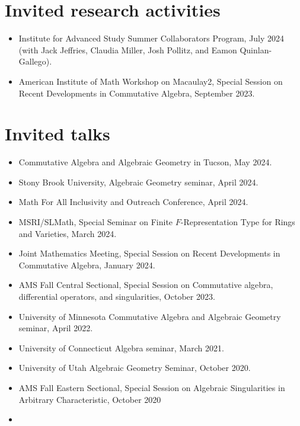 \documentclass{res}
\begin{document}
\begin{resume}
\section{Invited research activities}
\begin{itemize}
\item Institute for Advanced Study Summer Collaborators Program, July 2024 (with Jack Jeffries, Claudia Miller, Josh Pollitz, and Eamon Quinlan-Gallego).
\item American Institute of Math Workshop on Macaulay2, Special Session on Recent Developments in Commutative Algebra, September 2023.
\end{itemize}
\section{Invited talks}
\begin{itemize}
\item Commutative Algebra and Algebraic Geometry in Tucson, May 2024.
\item Stony Brook University, Algebraic Geometry seminar, April 2024.
\item Math For All Inclusivity and Outreach Conference, April 2024.
\item MSRI/SLMath, Special Seminar on Finite $F$-Representation Type for Rings and Varieties, March 2024.
\item Joint Mathematics Meeting, Special Session on Recent Developments in Commutative Algebra, January 2024.
\item 
AMS Fall Central Sectional, Special Session on Commutative algebra, differential operators, and singularities, October 2023.
\item 
University of Minnesota Commutative Algebra and Algebraic Geometry seminar, April 2022.
\item 
University of Connecticut Algebra seminar, March 2021.
\item 
University of Utah Algebraic Geometry Seminar, October 2020.
\item 
AMS Fall Eastern Sectional, Special Session on Algebraic Singularities in Arbitrary Characteristic, October 2020
\item 

\end{itemize}
\end{resume}
\end{document}
